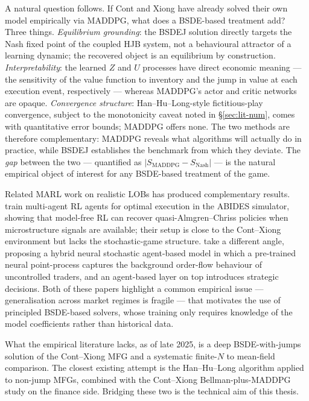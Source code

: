 A natural question follows.  If Cont and Xiong have already solved
their own model empirically via MADDPG, what does a BSDE-based
treatment add?  Three things.  \emph{Equilibrium grounding}: the
BSDEJ solution directly targets the Nash fixed point of the coupled
HJB system, not a behavioural attractor of a learning dynamic; the
recovered object is an equilibrium by construction.
\emph{Interpretability}: the learned $Z$ and $U$ processes have
direct economic meaning --- the sensitivity of the value function
to inventory and the jump in value at each execution event,
respectively --- whereas MADDPG's actor and critic networks are
opaque.  \emph{Convergence structure}: Han--Hu--Long-style
fictitious-play convergence, subject to the monotonicity caveat
noted in \S\ref{sec:lit-num}, comes with quantitative error
bounds; MADDPG offers none.  The two methods are therefore
complementary: MADDPG reveals what algorithms will actually do in
practice, while BSDEJ establishes the benchmark from which they
deviate.  The \emph{gap} between the two --- quantified as
$|S_{\mathrm{MADDPG}} - S_{\mathrm{Nash}}|$ --- is the natural
empirical object of interest for any BSDE-based treatment of the
game.

Related MARL work on realistic LOBs has produced complementary
results.  \citet{karpe2020} train multi-agent RL agents for
optimal execution in the ABIDES simulator, showing that model-free
RL can recover quasi-Almgren--Chriss policies when microstructure
signals are available; their setup is close to the Cont--Xiong
environment but lacks the stochastic-game structure.
\citet{shi2024} take a different angle, proposing a hybrid
neural stochastic agent-based model in which a pre-trained neural
point-process captures the background order-flow behaviour of
uncontrolled traders, and an agent-based layer on top introduces
strategic decisions.  Both of these papers highlight a common
empirical issue — generalisation across market regimes is fragile —
that motivates the use of principled BSDE-based solvers, whose
training only requires knowledge of the model coefficients rather
than historical data.

What the empirical literature lacks, as of late 2025, is a deep
BSDE-with-jumps solution of the Cont--Xiong MFG and a systematic
finite-$N$ to mean-field comparison.  The closest existing attempt
is the Han--Hu--Long algorithm applied to non-jump MFGs, combined
with the Cont--Xiong Bellman-plus-MADDPG study on the finance side.
Bridging these two is the technical aim of this thesis.

